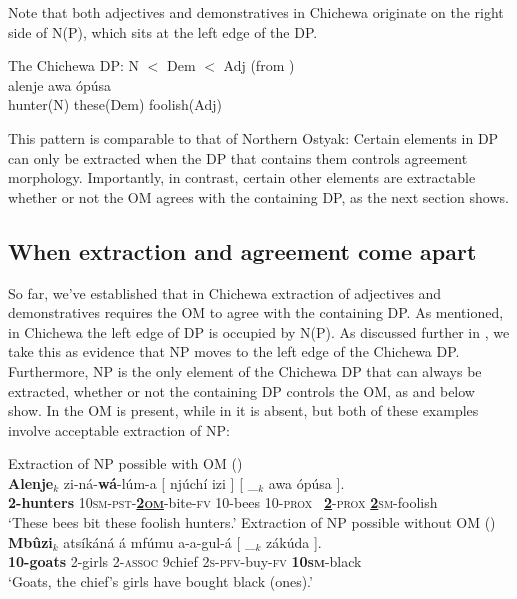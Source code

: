 \documentclass[output=paper,colorlinks,citecolor=brown]{langscibook}
\begin{document}
Note that both adjectives and demonstratives in Chichewa originate on the right side of N(P), which sits at the left edge of the DP.

\ea%
    \label{ex:branan:8}
    The Chichewa DP: N $<$ Dem $<$ Adj  \hfill{(from \citealt[ex. 2a]{Mchombo2006})}\\
    \gll    alenje awa \'{o}p\'{u}sa \\
            hunter(N) these(Dem) foolish(Adj) \\
\z

This pattern is comparable to that of Northern Ostyak: Certain elements in DP can only be extracted when the DP that contains them controls agreement morphology. Importantly, in contrast, certain other elements are extractable whether or not the OM agrees with the containing DP, as the next section shows.

\subsection{When extraction and agreement come apart}\label{sec:branan:3.2}

So far, we've established that in Chichewa extraction of adjectives and demonstratives requires the OM to agree with the containing DP. As mentioned, in Chichewa the left edge of DP is occupied by N(P). As discussed further in , we take this as evidence that NP moves to the left edge of the Chichewa DP. Furthermore, NP is the only element of the Chichewa DP that can always be extracted, whether or not the containing DP controls the OM, as  and  below show. In  the OM is present, while in  it is absent, but both of these examples involve acceptable extraction of NP:

\ea%
    \label{ex:branan:9}
    Extraction of NP possible with OM \hfill{(\citealt[50, ex. 16c]{Mchombo2004})}\\
    \gll    \textbf{Alenje}$_{k}$  zi-n\'{a}-\textbf{w\'{a}}-l\'{u}m-a [ nj\'{u}ch\'{i} izi ] [ \_$_{k}$  awa \'{o}p\'{u}sa ]. \\
            \textbf{2-hunters} 10\textsc{sm-pst}-\textbf{\underline{2\textsc{om}}}-bite-\textsc{fv} {} 10-bees 10-\textsc{prox} {} {} \, \underline{\textbf{2}}-\textsc{prox} \underline{\textbf{2}}\textsc{sm}-foolish \\
    \glt    `These bees bit these foolish hunters.'
\ex%
    \label{ex:branan:10}
    Extraction of NP possible without OM \hfill{(\citealt[ex. 4]{Mchombo2006})}\\
    \gll    \textbf{Mb\^{u}zi}$_{k}$ ats\'{i}k\'{a}n\'{a} \'{a} mf\'{u}mu a-a-gul-\'{a} [ \_$_{k}$ z\'{a}k\'{u}da ]. \\
            \textbf{10-goats} 2-girls 2-\textsc{assoc} 9chief 2\textsc{s-pfv}-buy-\textsc{fv} {} {} \textbf{10\textsc{sm}}-black   \\
    \glt    `Goats, the chief's girls have bought black (ones).'
\z
\end{document}
